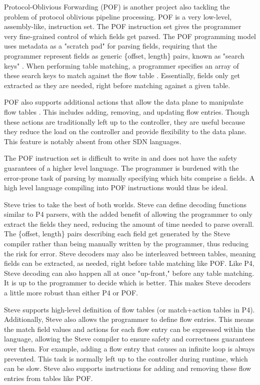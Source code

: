 Protocol-Oblivious Forwarding (POF) \cite{pof_fis, pof, pof_impl} is another
project also tackling the problem of protocol oblivious pipeline processing. POF
is a very low-level, assembly-like, instruction set. The POF instruction
set gives the programmer very fine-grained control of which fields get parsed.
The POF programming model uses metadata as a "scratch pad" for parsing fields,
requiring that the
programmer represent fields as generic \{offset, length\} pairs, known as
"search keys" \cite{pof}. When performing table matching, a programmer specifies
an array of these search keys to match against the flow table \cite{pof_impl}.
Essentially, fields only get extracted as they are needed, right before matching
against a given table.

POF also supports additional actions that allow the data plane to manipulate
flow tables \cite{pof}. This includes adding, removing, and updating flow
entries. Though these actions are traditionally left up to the controller, they
are useful because they reduce the load on the controller and provide
flexibility to the data plane. This feature is notably absent from other SDN
languages.

The POF instruction set is difficult to write in and does not have the safety
guarantees of a higher level language. The programmer is burdened with the
error-prone task of parsing by manually specifying which bits comprise a fields. A high level language compiling into POF instructions would thus be ideal.

Steve tries to take the best of both worlds. Steve can define decoding functions
similar to P4 parsers, with the added benefit of allowing the programmer to only
extract the fields they need, reducing the amount of time needed to parse
overall. The \{offset, length\} pairs describing each field get generated by the
Steve compiler rather than being manually written by the programmer, thus
reducing
the risk for error. Steve decoders may also be interleaved between tables,
meaning fields can be extracted, as needed, right before table matching like
POF. Like P4,
Steve decoding can also happen all at once "up-front," before any table
matching. 
It is up to the programmer to decide which is better. This makes Steve
decoders a little more robust than either P4 or POF. 

Steve supports high-level definition of flow tables (or match+action tables in
P4). Additionally, Steve also allows the programmer to define flow entries. This
means the match field values and actions for each flow entry can be expressed
within the language, allowing the Steve compiler to ensure safety and
correctness guarantees over them. For example, adding a flow entry that causes
an infinite loop is always prevented. This task is normally left up to the
controller during runtime, which can be slow. Steve also supports instructions
for adding and removing these flow entries from tables like POF.

